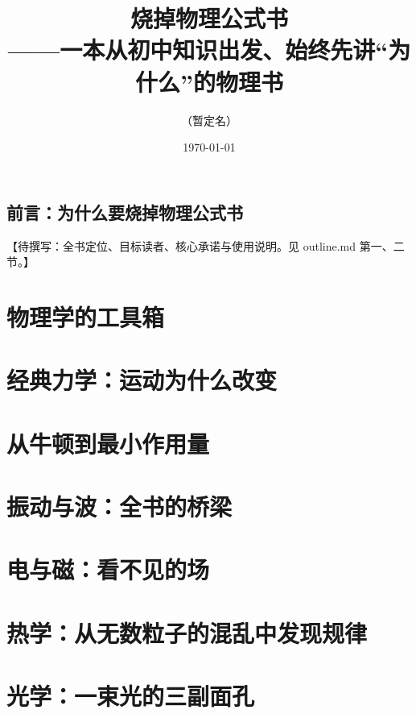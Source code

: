 \documentclass[fontset=fandol,12pt,openany]{ctexbook}
\title{烧掉物理公式书\\{\large ——一本从初中知识出发、始终先讲“为什么”的物理书}}
\author{（暂定名）}
\date{\today}
\begin{document}
\frontmatter
\maketitle

\chapter*{前言：为什么要烧掉物理公式书}
【待撰写：全书定位、目标读者、核心承诺与使用说明。见 outline.md 第一、二节。】

\tableofcontents
\mainmatter

\part{物理学的工具箱}




\part{经典力学：运动为什么改变}








\part{从牛顿到最小作用量}



\part{振动与波：全书的桥梁}



\part{电与磁：看不见的场}







\part{热学：从无数粒子的混乱中发现规律}







\part{光学：一束光的三副面孔}





\end{document}
